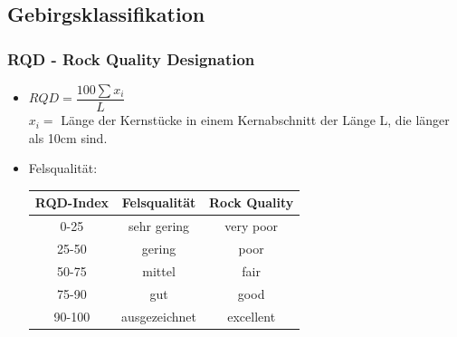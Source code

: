\documentclass[fleqn,twoside]{article}
\begin{document}
\subsection{Gebirgsklassifikation}
\subsubsection{RQD - Rock Quality Designation}
\begin{itemize}
    \item $RQD = \dfrac{100 \sum x_i}{L}$\\ 
    $x_i =$ Länge der Kernstücke in einem Kernabschnitt der Länge L, die länger als 10cm sind.
    \item Felsqualität:\\
        \begin{tabular}{|c|c|c|}
            \hline
            \textbf{RQD-Index} & \textbf{Felsqualität} & \textbf{Rock Quality} \\ \hline
            0-25               & sehr gering           & very poor             \\ \hline
            25-50              & gering                & poor                  \\ \hline
            50-75              & mittel                & fair                  \\ \hline
            75-90              & gut                   & good                  \\ \hline
            90-100             & ausgezeichnet         & excellent             \\ \hline
        \end{tabular}
\end{itemize}
\end{document}
